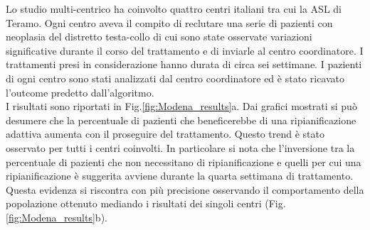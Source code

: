 Lo studio multi-centrico ha coinvolto quattro centri italiani tra cui la ASL di Teramo. Ogni centro aveva il compito di reclutare una serie di pazienti con neoplasia del distretto testa-collo di cui sono state osservate variazioni significative durante il corso del trattamento e di inviarle al centro coordinatore. I trattamenti presi in considerazione hanno durata di circa sei settimane. I pazienti di ogni centro sono stati analizzati dal centro coordinatore ed è stato ricavato l'outcome predetto dall'algoritmo. \\
I risultati sono riportati in Fig.\ref{fig:Modena_results}a. Dai grafici mostrati si può desumere che la percentuale di pazienti che beneficerebbe di una ripianificazione adattiva aumenta con il proseguire del trattamento. Questo trend è stato osservato per tutti i centri coinvolti. In particolare si nota che l'inversione tra la percentuale di pazienti che non necessitano di ripianificazione e quelli per cui una ripianificazione è suggerita avviene durante la quarta settimana di trattamento. Questa evidenza si riscontra con più precisione osservando il comportamento della popolazione ottenuto mediando i risultati dei singoli centri (Fig.\ref{fig:Modena_results}b).


